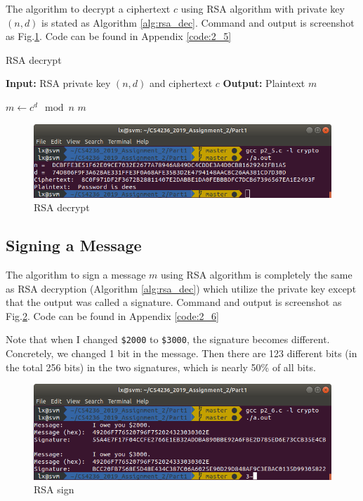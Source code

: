 The algorithm to decrypt a ciphertext $c$ using RSA algorithm with private key $(n, d) $ is stated as Algorithm \ref{alg:rsa_dec}.
Command and output is screenshot as Fig.\ref{fig:p2_5}.
Code can be found in Appendix \ref{code:2_5}

\begin{algorithm}
\caption{RSA decrypt}
\label{alg:rsa_dec}
\begin{algorithmic}
\STATE \textbf{Input:} RSA private key $(n, d)$ and ciphertext $c$
\STATE \textbf{Output:} Plaintext $m$

\STATE $ m \gets c^d \mod{n} $
\RETURN $ m $
\end{algorithmic}
\end{algorithm}

\begin{figure}[b!]
\centering
\includegraphics[width=\columnwidth]{pictures/p2_5.png}
\caption{
    RSA decrypt
}
\label{fig:p2_5}
\end{figure}

\subsection{Signing a Message}
\label{subs:sign}

The algorithm to sign a message $m$ using RSA algorithm is completely the same as RSA decryption (Algorithm \ref{alg:rsa_dec}) which utilize the private key except that the output was called a signature.
Command and output is screenshot as Fig.\ref{fig:p2_6}.
Code can be found in Appendix \ref{code:2_6}

Note that when I changed \texttt{\$2000} to \texttt{\$3000}, the signature becomes different. Concretely, we changed 1 bit in the message. Then there are 123 different bits (in the total 256 bits) in the two signatures, which is nearly 50\% of all bits.

\begin{figure}[b!]
\centering
\includegraphics[width=\columnwidth]{pictures/p2_6.png}
\caption{
    RSA sign
}
\label{fig:p2_6}
\end{figure}


